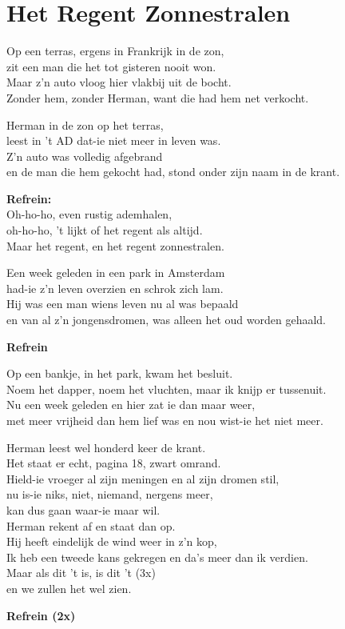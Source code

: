 \section{Het Regent Zonnestralen}
Op een terras, ergens in Frankrijk in de zon,\\
zit een man die het tot gisteren nooit won.\\
Maar z'n auto vloog hier vlakbij uit de bocht.\\
Zonder hem, zonder Herman, want die had hem net verkocht.

Herman in de zon op het terras,\\
leest in 't AD dat-ie niet meer in leven was.\\
Z'n auto was volledig afgebrand\\
en de man die hem gekocht had, stond onder zijn naam in de krant.

\textbf{Refrein:}\\
Oh-ho-ho, even rustig ademhalen,\\
oh-ho-ho, 't lijkt of het regent als altijd.\\
Maar het regent, en het regent zonnestralen.

Een week geleden in een park in Amsterdam\\
had-ie z'n leven overzien en schrok zich lam.\\
Hij was een man wiens leven nu al was bepaald\\
en van al z'n jongensdromen, was alleen het oud worden gehaald.

\textbf{Refrein}

Op een bankje, in het park, kwam het besluit.\\
Noem het dapper, noem het vluchten, maar ik knijp er tussenuit.\\
Nu een week geleden en hier zat ie dan maar weer,\\
met meer vrijheid dan hem lief was en nou wist-ie het niet meer.

Herman leest wel honderd keer de krant.\\
Het staat er echt, pagina 18, zwart omrand.\\
Hield-ie vroeger al zijn meningen en al zijn dromen stil,\\
nu is-ie niks, niet, niemand, nergens meer,\\
kan dus gaan waar-ie maar wil.\\
Herman rekent af en staat dan op.\\
Hij heeft eindelijk de wind weer in z'n kop,\\
Ik heb een tweede kans gekregen en da's meer dan ik verdien.\\
Maar als dit 't is, is dit 't (3x)\\
en we zullen het wel zien.

\textbf{Refrein (2x)}
